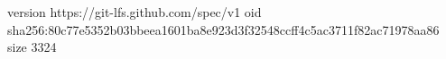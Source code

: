 version https://git-lfs.github.com/spec/v1
oid sha256:80c77e5352b03bbeea1601ba8e923d3f32548ccff4c5ac3711f82ac71978aa86
size 3324
